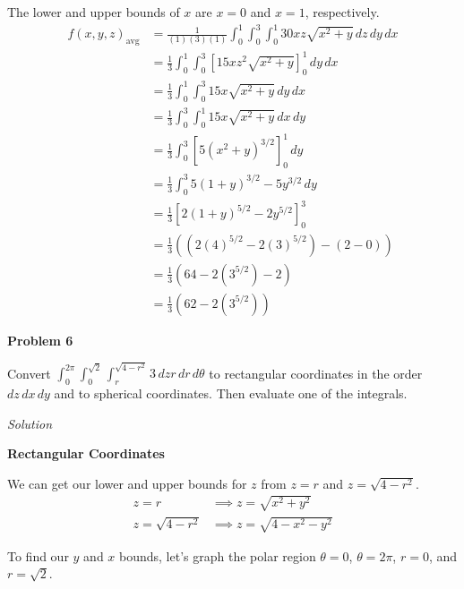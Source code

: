 \documentclass{article}
\newcommand{\lrp}[1]{\left( #1 \right)}
\newcommand{\lrb}[1]{\left[ #1 \right]}
\newcommand{\Solution}{\textit{Solution}}
\begin{document}
The lower and upper bounds of $x$ are $x=0$ and $x=1$, respectively.
\begin{align*}
    f(x,y,z)_{\text{avg}}&=\frac{1}{(1)(3)(1)}\int_0^1\int_0^3\int_0^1 30xz\sqrt{x^2+y}\,dz\,dy\,dx\\
    &=\frac{1}{3}\int_0^1\int_0^3\lrb{15xz^2\sqrt{x^2+y}}_0^1\,dy\,dx\\
    &=\frac{1}{3}\int_0^1\int_0^3 15x\sqrt{x^2+y}\,dy\,dx\\
    &=\frac{1}{3}\int_0^3\int_0^1 15x\sqrt{x^2+y}\,dx\,dy\tag{ok since $x$ and $y$ independent}\\
    &=\frac{1}{3}\int_0^3\lrb{5(x^2+y)^{3/2}}_0^1\,dy\tag{you can also do u-sub, $u=x^2+y$}\\
    &=\frac{1}{3}\int_0^3 5(1+y)^{3/2}-5y^{3/2}\,dy\\
    &=\frac{1}{3}\lrb{2(1+y)^{5/2}-2y^{5/2}}_0^3\tag{you can also break up and do $u$ sub, $u=1+y$}\\
    &=\frac{1}{3}\lrp{\lrp{2(4)^{5/2}-2(3)^{5/2}}-\lrp{2-0}}\\
    &=\frac{1}{3}\lrp{64-2(3^{5/2})-2}\\
    &=\boxed{\frac{1}{3}\lrp{62-2(3^{5/2})}}
\end{align*}
{}\textbf{Problem 6}

Convert $\displaystyle \int_0^{2\pi}\int_0^{\sqrt{2}}\int_r^{\sqrt{4-r^2}}3\,dzr\,dr\,d\theta$ to rectangular coordinates in the order $dz\,dx\,dy$ and to spherical coordinates. Then evaluate one of the integrals.

\Solution

{}\textbf{Rectangular Coordinates}

We can get our lower and upper bounds for $z$ from $z=r$ and $z=\sqrt{4-r^2}$.
\begin{align*}
    z=r&\implies z=\sqrt{x^2+y^2}\\
    z=\sqrt{4-r^2}&\implies z=\sqrt{4-x^2-y^2}
\end{align*}

To find our $y$ and $x$ bounds, let's graph the polar region $\theta =0$, $\theta = 2\pi$, $r=0$, and $r=\sqrt{2}$.
\end{document}
